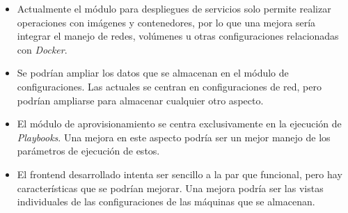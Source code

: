 \begin{itemize}
	\item Actualmente el módulo para despliegues de servicios solo permite realizar operaciones con imágenes y contenedores, por lo que una mejora sería integrar el manejo de redes, volúmenes u otras configuraciones relacionadas con \textit{Docker}.
	\item Se podrían ampliar los datos que se almacenan en el módulo de configuraciones. Las actuales se centran en configuraciones de red, pero podrían ampliarse para almacenar cualquier otro aspecto.
	\item El módulo de aprovisionamiento se centra exclusivamente en la ejecución de \textit{Playbooks}. Una mejora en este aspecto podría ser un mejor manejo de los parámetros de ejecución de estos.
	\item El frontend desarrollado intenta ser sencillo a la par que funcional, pero hay características que se podrían mejorar. Una mejora podría ser las vistas individuales de las configuraciones de las máquinas que se almacenan.
\end{itemize}

